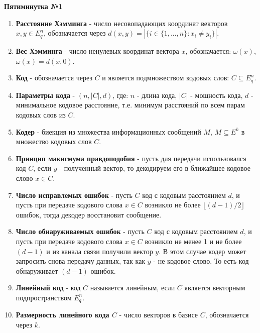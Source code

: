 \documentclass[a4paper, 12pt]{report}
\begin{document}
\textbf{Пятиминутка №1}

\begin{enumerate}
\item \textbf{Расстояние Хэмминга} - число несовопадающих координат векторов $x, y \in E_{q}^{n} $, обозначается через $d(x,y) = |\lbrace i \in \lbrace1, ... , n\rbrace : x_i \neq y_i \rbrace| $.

\item \textbf{Вес Хэмминга} - число ненулевых координат вектора $x $, обозначается: $\omega (x) $, $\omega (x) = d(x,0) $.

\item \textbf{Код} - обозначается через $C $ и является подмножеством кодовых слов: $C \subseteq E_{q}^{n} $.

\item \textbf{Параметры кода} - $(n, |C|, d) $, где:
$n $ - длина кода,
$|C| $ - мощность кода,
$d $ - минимальное кодовое расстояние, т.е. минимум расстояний по всем парам кодовых слов из $C $.

\item \textbf{Кодер} - биекция из множества информационных сообщений $M $, $M \subseteq E^{k}$ в множество кодовых слов $C $.

\item \textbf{Принцип макисмума правдоподобия} - пусть для передачи использовался код $C $, если $y $ - полученный вектор, то декодируем его в ближайшее кодовое слово $x\in C$. 

\item \textbf{Число исправлемых ошибок} - пусть $C $ код с кодовым расстоянием $d $, и пусть при передаче кодового слова $x \in C $ возникло не более $\lfloor (d-1)/2 \rfloor $ ошибок, тогда декодер восстановит сообщение. 

\item \textbf{Число обнаруживаемых ошибок} - пусть $C $ код с кодовым расстоянием $d $, и пусть при передаче кодового слова $x \in C $ возникло не менее 1 и не более $(d-1) $ и из канала связи получили вектор $y $. В этом случае кодер может запросить снова передачу данных, так как $y $ - не кодовое слово. То есть код обнаруживает $(d-1) $ ошибок.

\item \textbf{Линейный код} - код $C $ называется линейным, если $C $ является векторным подпространством $E_{q}^{n} $.

\item \textbf{Размерность линейного кода $C $} - число векторов в базисе $C $, обозначается через $k $.


\end{enumerate}
\end{document}
